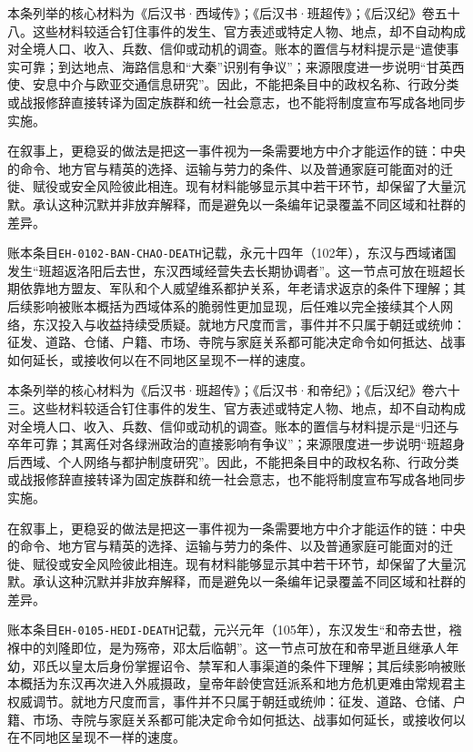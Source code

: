 本条列举的核心材料为《后汉书·西域传》；《后汉书·班超传》；《后汉纪》卷五十八。这些材料较适合钉住事件的发生、官方表述或特定人物、地点，却不自动构成对全境人口、收入、兵数、信仰或动机的调查。账本的置信与材料提示是“遣使事实可靠；到达地点、海路信息和“大秦”识别有争议”；来源限度进一步说明“甘英西使、安息中介与欧亚交通信息研究”。因此，不能把条目中的政权名称、行政分类或战报修辞直接转译为固定族群和统一社会意志，也不能将制度宣布写成各地同步实施。

在叙事上，更稳妥的做法是把这一事件视为一条需要地方中介才能运作的链：中央的命令、地方官与精英的选择、运输与劳力的条件、以及普通家庭可能面对的迁徙、赋役或安全风险彼此相连。现有材料能够显示其中若干环节，却保留了大量沉默。承认这种沉默并非放弃解释，而是避免以一条编年记录覆盖不同区域和社群的差异。

账本条目\texttt{EH-0102-BAN-CHAO-DEATH}记载，永元十四年（102年），东汉与西域诸国发生“班超返洛阳后去世，东汉西域经营失去长期协调者”。这一节点可放在班超长期依靠地方盟友、军队和个人威望维系都护关系，年老请求返京的条件下理解；其后续影响被账本概括为西域体系的脆弱性更加显现，后任难以完全接续其个人网络，东汉投入与收益持续受质疑。就地方尺度而言，事件并不只属于朝廷或统帅：征发、道路、仓储、户籍、市场、寺院与家庭关系都可能决定命令如何抵达、战事如何延长，或接收何以在不同地区呈现不一样的速度。

本条列举的核心材料为《后汉书·班超传》；《后汉书·和帝纪》；《后汉纪》卷六十三。这些材料较适合钉住事件的发生、官方表述或特定人物、地点，却不自动构成对全境人口、收入、兵数、信仰或动机的调查。账本的置信与材料提示是“归还与卒年可靠；其离任对各绿洲政治的直接影响有争议”；来源限度进一步说明“班超身后西域、个人网络与都护制度研究”。因此，不能把条目中的政权名称、行政分类或战报修辞直接转译为固定族群和统一社会意志，也不能将制度宣布写成各地同步实施。

在叙事上，更稳妥的做法是把这一事件视为一条需要地方中介才能运作的链：中央的命令、地方官与精英的选择、运输与劳力的条件、以及普通家庭可能面对的迁徙、赋役或安全风险彼此相连。现有材料能够显示其中若干环节，却保留了大量沉默。承认这种沉默并非放弃解释，而是避免以一条编年记录覆盖不同区域和社群的差异。

账本条目\texttt{EH-0105-HEDI-DEATH}记载，元兴元年（105年），东汉发生“和帝去世，襁褓中的刘隆即位，是为殇帝，邓太后临朝”。这一节点可放在和帝早逝且继承人年幼，邓氏以皇太后身份掌握诏令、禁军和人事渠道的条件下理解；其后续影响被账本概括为东汉再次进入外戚摄政，皇帝年龄使宫廷派系和地方危机更难由常规君主权威调节。就地方尺度而言，事件并不只属于朝廷或统帅：征发、道路、仓储、户籍、市场、寺院与家庭关系都可能决定命令如何抵达、战事如何延长，或接收何以在不同地区呈现不一样的速度。

